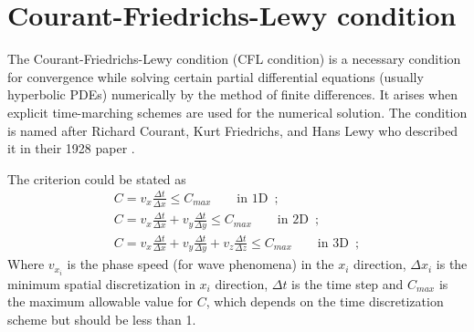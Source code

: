 \documentclass[12pt,letterpaper,landscape]{article}
\begin{document}
\section{Courant-Friedrichs-Lewy condition}

The Courant-Friedrichs-Lewy condition (CFL condition) is a necessary condition for convergence while solving certain partial differential equations (usually hyperbolic PDEs) numerically by the method of finite differences. It arises when explicit time-marching schemes are used for the numerical solution. The condition is named after Richard Courant, Kurt Friedrichs, and Hans Lewy who described it in their 1928 paper
\cite{CFL}.

The criterion could be stated as 
\begin{align*}
C=v_{x}\frac{\Delta t}{\Delta x}\leq C_{max}\qquad\mbox{in 1D}\enspace;\\
C=v_{x}\frac{\Delta t}{\Delta x}+v_{y}\frac{\Delta t}{\Delta y}\leq C_{max}\qquad\mbox{in 2D}\enspace;\\
C=v_{x}\frac{\Delta t}{\Delta x}+v_{y}\frac{\Delta t}{\Delta y}+v_{z}\frac{\Delta t}{\Delta z}\leq C_{max}\qquad\mbox{in 3D}\enspace;
\end{align*}
 Where $v_{x_{i}}$ is the phase speed (for wave phenomena) in the $x_{i}$ direction, $\Delta x_{i}$ is the minimum spatial discretization in $x_{i}$ direction, $\Delta t$ is the time step and $C_{max}$ is the maximum allowable value for $C$, which depends on the time discretization scheme but should be less than 1.
\end{document}
